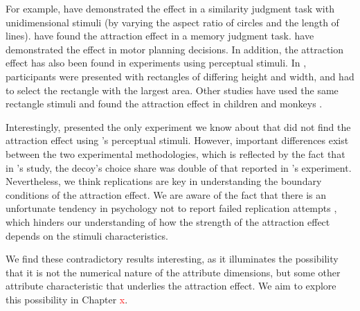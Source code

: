\documentclass[11pt,a4paper]{article}
\begin{document}
For example,  have demonstrated the effect in a similarity judgment task with unidimensional stimuli (by varying the aspect ratio of circles and the length of lines).  have found the attraction effect in a memory judgment task.   have demonstrated the effect in motor planning decisions. In addition, the attraction effect has also been found in experiments using perceptual stimuli. In \citeauthor{Trueblood2013}, participants were presented with rectangles of differing height and width, and had to select the rectangle with the largest area. Other studies have used the same rectangle stimuli and found the attraction effect in children \cite{Zhen2016} and monkeys \cite{Parrish2015}.

 Interestingly, \citeauthor{Frederick2014} presented the only experiment we know about that did not find the attraction effect using 's perceptual stimuli. However, important differences exist between the two experimental methodologies, which is reflected by the fact that in \citeauthor{Frederick2014}'s study, the decoy's choice share was double of that reported in \citeauthor{Trueblood2013}'s experiment. Nevertheless, we think replications are key in understanding the boundary conditions of the attraction effect. We are aware of the fact that there is an unfortunate tendency in psychology not to report failed replication attempts \cite{Ingre2015}, which hinders our understanding of how the strength of the attraction effect depends on the stimuli characteristics.

We find these contradictory results interesting, as it illuminates the possibility that it is not the numerical nature of the attribute dimensions, but some other attribute characteristic that underlies the attraction effect. We aim to explore this possibility in Chapter \textcolor{red}{x}.














\newpage


\end{document}
